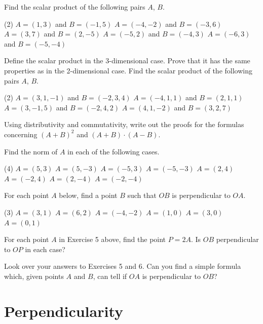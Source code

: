 \documentclass[12pt]{book} %
\begin{document}
\begin{ExerciseList}
\setcounter{Exercise}{0}
\begin{ExerciseList}
	
\Exercise Find the scalar product of the following pairs $A$, $B$.
\begin{tasks}(2)
\task[(a)] $A=(1,3)$ and $B=(-1,5)$
\task[(b)] $A=(-4,-2)$ and $B=(-3,6)$
\task[(c)] $A=(3,7)$ and $B=(2,-5)$
\task[(d)] $A=(-5,2)$ and $B=(-4,3)$
\task[(e)] $A=(-6,3)$ and $B=(-5,-4)$
\end{tasks}

\Exercise Define the scalar product in the 3-dimensional case. Prove that it has the same properties as in the 2-dimensional case. Find the scalar product of the following pairs $A$, $B$.
\begin{tasks}(2)
\task[(a)] $A=(3,1,-1)$ and $B=(-2,3,4)$
\task[(b)] $A=(-4,1,1)$ and $B=(2,1,1)$
\task[(c)] $A=(3,-1,5)$ and $B=(-2,4,2)$
\task[(d)] $A=(4,1,-2)$ and $B=(3,2,7)$
\end{tasks}

\Exercise Using distributivity and commutativity, write out the proofs for the formulas concerning $(A+B)^2$ and $(A+B)\cdot(A-B)$.

\Exercise Find the norm of $A$ in each of the following cases.
\begin{tasks}(4)
\task[(a)] $A=(5,3)$
\task[(b)] $A=(5,-3)$
\task[(c)] $A=(-5,3)$
\task[(d)] $A=(-5,-3)$
\task[(e)] $A=(2,4)$
\task[(f)] $A=(-2,4)$
\task[(g)] $A=(2,-4)$
\task[(h)] $A=(-2,-4)$
\end{tasks}

\Exercise For each point $A$ below, find a point $B$ such that $OB$ is perpendicular to $OA$.
\begin{tasks}(3)
\task[(a)] $A=(3,1)$
\task[(b)] $A=(6,2)$
\task[(c)] $A=(-4,-2)$
\task[(d)] $A=(1,0)$
\task[(e)] $A=(3,0)$
\task[(f)] $A=(0,1)$
\end{tasks}

\Exercise For each point $A$ in Exercise 5 above, find the point $P=2A$. Is $OB$ perpendicular to $OP$ in each case?

\Exercise Look over your answers to Exercises 5 and 6. Can you find a simple formula which, given points $A$ and $B$, can tell if $OA$ is perpendicular to $OB$?

\end{ExerciseList}

\section{Perpendicularity}


\end{ExerciseList}
\end{document}
